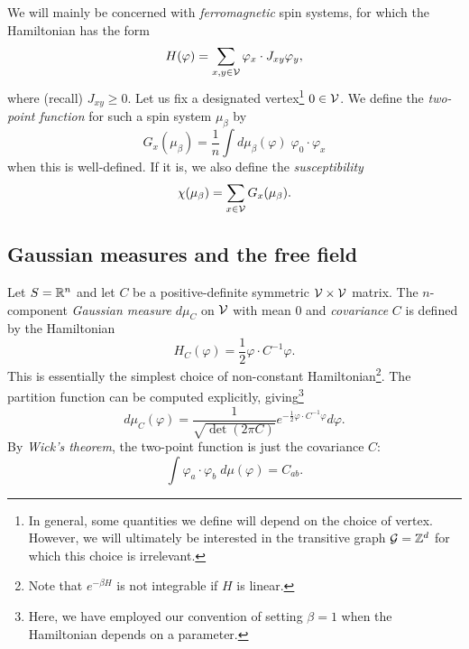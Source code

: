 We will mainly be concerned with \emph{ferromagnetic} spin systems, for which the Hamiltonian
has the form
\begin{equation}
H(\varphi) = \sum_{x, y \in \mathcal{V}} \varphi_x \cdot J_{xy} \varphi_y,
\end{equation}
where (recall) $J_{xy} \ge 0$.
Let us fix a designated vertex\footnote{In general, some quantities we define will depend
on the choice of vertex. However, we will ultimately be interested in the transitive graph
$\mathcal{G} = { {{\mathbb Z}}^d }$ for which this choice is irrelevant.} $0 \in \mathcal{V}$.
We define the \emph{two-point function} for such a spin system $\mu_\beta$ by
\begin{equation}
G_x(\mu_\beta) = \frac{1}{n} \int d\mu_\beta(\varphi) \; \varphi_0 \cdot \varphi_x
\end{equation}
when this is well-defined. If it is, we also define the \emph{susceptibility}
\begin{equation}
\chi(\mu_\beta) = \sum_{x\in\mathcal{V}} G_x(\mu_\beta).
\end{equation}


\subsection{Gaussian measures and the free field}

Let $S = {\mathbb R}^n$ and let $C$ be a positive-definite symmetric $\mathcal{V}\times\mathcal{V}$ matrix.
The $n$-component
\emph{Gaussian measure} $d\mu_C$ on $\mathcal{V}$ with mean $0$ and \emph{covariance} $C$ is defined
by the Hamiltonian
\begin{equation}
H_C(\varphi) = \frac{1}{2} \varphi \cdot C^{-1} \varphi.
\end{equation}
This is essentially the simplest choice of non-constant Hamiltonian\footnote{Note that
$e^{-\beta H}$ is not integrable if $H$ is linear.}.
The partition function can be computed explicitly, giving\footnote{Here, we have employed
our convention of setting $\beta = 1$ when the Hamiltonian depends on a parameter.}
\begin{equation}
d\mu_C(\varphi)
  =
\frac{1}{\sqrt{\det(2\pi C)}} e^{-\frac{1}{2} \varphi\cdot C^{-1}\varphi} d\varphi.
\end{equation}
By \emph{Wick's theorem}, the two-point function is just the covariance $C$:
\begin{equation}
\int \varphi_a \cdot \varphi_b \; d\mu(\varphi) = C_{ab}.
\end{equation}

